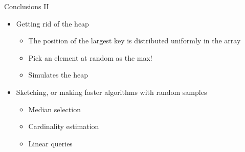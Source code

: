 \documentclass[aspectratio=169, handout]{beamer}
\begin{document}
\begin{frame}{Conclusions II}
    \begin{itemize}
        \item<1-> Getting rid of the heap
              \begin{itemize}
                  \item The position of the largest key is distributed uniformly in the array
                  \item Pick an element at random as the max!
                  \item Simulates the heap
              \end{itemize}
        \item<2-> Sketching, or making faster algorithms with random samples
              \begin{itemize}
                  \item Median selection
                  \item Cardinality estimation
                  \item Linear queries
              \end{itemize}
    \end{itemize}

\end{frame}
\end{document}
